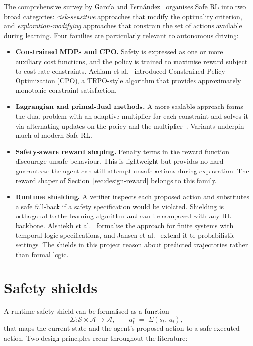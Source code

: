 The comprehensive survey by Garc\'ia and Fern\'andez~\cite{garcia2015comprehensive} organises
Safe RL into two broad categories: \emph{risk-sensitive} approaches that modify the optimality
criterion, and \emph{exploration-modifying} approaches that constrain the set of actions available
during learning. Four families are particularly relevant to autonomous driving:

\begin{itemize}
  \item \textbf{Constrained MDPs and CPO.} Safety is expressed as one or more auxiliary cost
        functions, and the policy is trained to maximise reward subject to cost-rate constraints.
        Achiam et al.~\cite{achiam2017cpo} introduced Constrained Policy Optimization (CPO), a
        TRPO-style algorithm that provides approximately monotonic constraint satisfaction.
  \item \textbf{Lagrangian and primal-dual methods.} A more scalable approach forms the dual
        problem with an adaptive multiplier for each constraint and solves it via alternating
        updates on the policy and the multiplier~\cite{stooke2020responsive}. Variants underpin
        much of modern Safe RL.
  \item \textbf{Safety-aware reward shaping.} Penalty terms in the reward function discourage
        unsafe behaviour. This is lightweight but provides no hard guarantees: the agent can
        still attempt unsafe actions during exploration. The reward shaper of
        Section~\ref{sec:design-reward} belongs to this family.
  \item \textbf{Runtime shielding.} A verifier inspects each proposed action and substitutes a
        safe fall-back if a safety specification would be violated. Shielding is orthogonal to
        the learning algorithm and can be composed with any RL backbone. Alshiekh et
        al.~\cite{alshiekh2018shielding} formalise the approach for finite systems with
        temporal-logic specifications, and Jansen et al.~\cite{jansen2020shielded} extend it to
        probabilistic settings. The shields in this project reason about predicted trajectories
        rather than formal logic.
\end{itemize}

\section{Safety shields}\label{sec:sota-shielding}

A runtime safety shield can be formalised as a function
\begin{equation}
  \Sigma: \mathcal{S}\times\mathcal{A} \to \mathcal{A},
  \qquad
  a^{\star}_t \;=\; \Sigma(s_t,\, a_t),
  \label{eq:shield-fn}
\end{equation}
that maps the current state and the agent's proposed action to a safe executed action. Two design
principles recur throughout the literature:

